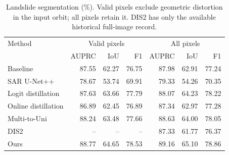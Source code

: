 \begin{table}[!t]
\caption{Landslide segmentation (\%). Valid pixels exclude geometric distortion in the input orbit; all pixels retain it. DIS2 has only the available historical full-image record.}
\label{tab:primary}
\centering\scriptsize
\setlength{\tabcolsep}{2.5pt}
\begin{tabular}{lrrrrrr}
\toprule
Method & \multicolumn{3}{c}{Valid pixels} & \multicolumn{3}{c}{All pixels}\\
 & AUPRC & IoU & F1 & AUPRC & IoU & F1\\
\midrule
Baseline & 87.55 & 62.27 & 76.75 & 87.98 & 62.91 & 77.24\\
SAR U-Net++ \cite{Boehm2022} & 78.67 & 53.74 & 69.91 & 79.33 & 54.26 & 70.35\\
Logit distillation \cite{Hinton2015} & 87.63 & 63.66 & 77.79 & 88.07 & 64.23 & 78.22\\
Online distillation \cite{Liu2024} & 86.89 & 62.45 & 76.89 & 87.34 & 62.97 & 77.28\\
Multi-to-Uni \cite{Sun2027} & 88.24 & 63.48 & 77.66 & 88.63 & 64.00 & 78.05\\
DIS2 \cite{Kieu2026DIS2} & -- & -- & -- & 87.33 & 61.77 & 76.37\\
Ours & 88.77 & 64.65 & 78.53 & 89.16 & 65.10 & 78.86\\
\bottomrule
\end{tabular}
\end{table}
